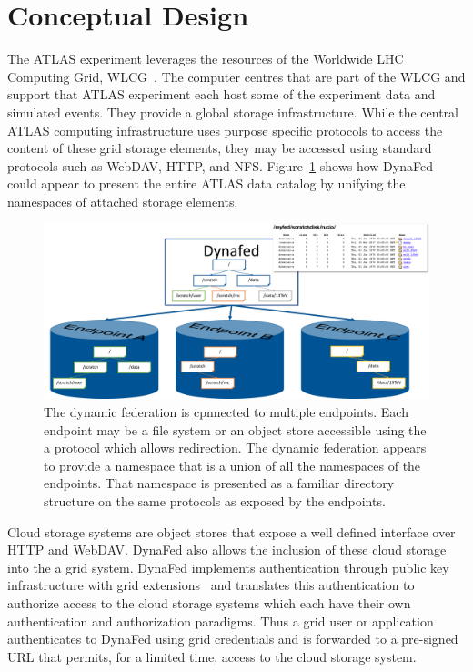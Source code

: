 \documentclass[a4paper]{jpconf}
\begin{document}
\section{Conceptual Design}
The ATLAS experiment leverages the resources of the Worldwide LHC Computing Grid, WLCG~\cite{wlcg}. The computer centres that are part of the WLCG and support that ATLAS experiment each host some of the experiment data and simulated events. They provide a global storage infrastructure. While the central ATLAS computing infrastructure uses purpose specific protocols to access the content of these grid storage elements, they may be accessed using standard protocols such as WebDAV, HTTP, and NFS. Figure~\ref{fig:conceptual-design} shows how DynaFed could appear to present the entire ATLAS data catalog by unifying the namespaces of attached storage elements.

\begin{figure}
  \centering
  \includegraphics[width=\textwidth]{conceptual-design.png}
  \caption{The dynamic federation is cpnnected to multiple endpoints. Each endpoint may be a file system or an object store accessible using the a protocol which allows redirection. The dynamic federation appears to provide a namespace that is a union of all the namespaces of the endpoints. That namespace is presented as a familiar directory structure on the same protocols as exposed by the endpoints.}
  \label{fig:conceptual-design}
\end{figure}

Cloud storage systems are object stores that expose a well defined interface over HTTP and WebDAV. DynaFed also allows the inclusion of these cloud storage into the a grid system. DynaFed implements authentication through public key infrastructure with grid extensions~\cite{voms} and translates this authentication to authorize access to the cloud storage systems which each have their own authentication and authorization paradigms. Thus a grid user or application authenticates to DynaFed using grid credentials and is forwarded to a pre-signed URL that permits, for a limited time, access to the cloud storage system.
\end{document}
